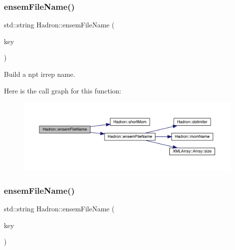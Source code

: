 \subsubsection{\texorpdfstring{ensemFileName()}{ensemFileName()}\hspace{0.1cm}{\footnotesize\ttfamily [10/12]}}
{\footnotesize\ttfamily std\+::string Hadron\+::ensem\+File\+Name (\begin{DoxyParamCaption}\item[{const \mbox{\hyperlink{structHadron_1_1KeyHadronSUNNPartIrrep__t}{Key\+Hadron\+S\+U\+N\+N\+Part\+Irrep\+\_\+t}} \&}]{key }\end{DoxyParamCaption})}



Build a npt irrep name. 

Here is the call graph for this function\+:\nopagebreak
\begin{figure}[H]
\begin{center}
\leavevmode
\includegraphics[width=350pt]{d1/daf/namespaceHadron_a45ea107463dbd2ccf4ceae63b851f861_cgraph}
\end{center}
\end{figure}
\mbox{\label{namespaceHadron_aa7a6f1af8bf69b8a63890e92bfaaf738}} 
\subsubsection{\texorpdfstring{ensemFileName()}{ensemFileName()}\hspace{0.1cm}{\footnotesize\ttfamily [11/12]}}
{\footnotesize\ttfamily std\+::string Hadron\+::ensem\+File\+Name (\begin{DoxyParamCaption}\item[{const \mbox{\hyperlink{structHadron_1_1KeyHadronSUNNPartNPtCorr__t_1_1NPoint__t}{Hadron\+::\+Key\+Hadron\+S\+U\+N\+N\+Part\+N\+Pt\+Corr\+\_\+t\+::\+N\+Point\+\_\+t}} \&}]{key }\end{DoxyParamCaption})}

